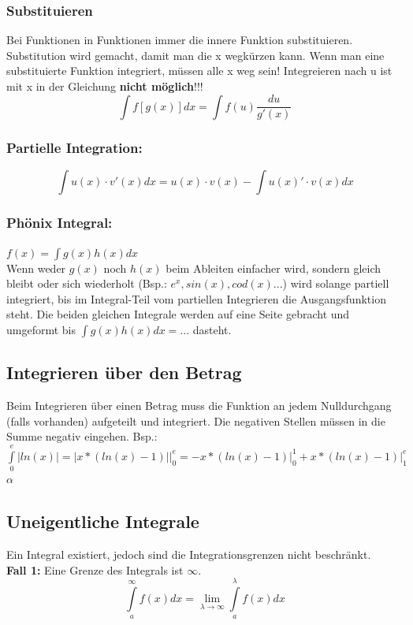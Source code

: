 \subsubsection{Substituieren}
Bei Funktionen in Funktionen immer die innere Funktion substituieren.
Substitution wird gemacht, damit man die x wegkürzen kann. 
Wenn man eine substituierte Funktion integriert, müssen alle x weg sein! Integreieren nach u ist mit x in der Gleichung \textbf{nicht möglich}!!!\\
\[\int f\left[g(x)\right] dx = \int f(u) \frac{du}{g'(x)}\]

\subsubsection{Partielle Integration:}
\[\int u(x)\cdot v'(x)dx = u(x)\cdot v(x)-\int u(x)'\cdot v(x)dx\]

\subsubsection{Phönix Integral:}
$f(x)= \int g(x)h(x)dx$\\

Wenn weder $g(x)$ noch $h(x)$ beim Ableiten einfacher wird, sondern gleich bleibt oder sich wiederholt (Bsp.: $e^x, sin(x), cod(x)...$) wird solange partiell integriert, bis im Integral-Teil vom partiellen Integrieren die Ausgangsfunktion steht. Die beiden gleichen Integrale werden auf eine Seite gebracht und umgeformt bis $\int g(x)h(x)dx = ... $ dasteht.


\subsection{Integrieren über den Betrag}
Beim Integrieren über einen Betrag muss die Funktion an jedem Nulldurchgang (falls vorhanden) aufgeteilt und integriert. Die negativen Stellen müssen in die Summe negativ eingehen.
Bsp.: $\int\limits_{0}^{e}|ln(x)| = |x*(ln(x)-1)|\big|_{0}^{e} = -x*(ln(x)-1)\big|_{0}^{1} + x*(ln(x)-1)\big|_{1}^{e}$ 
$\alpha$

\subsection{Uneigentliche Integrale}
Ein Integral existiert, jedoch sind die Integrationsgrenzen nicht beschränkt.\\
\textbf{Fall 1:} Eine Grenze des Integrals ist $\infty$.
\[\int\limits_a^{\infty}f(x)dx = \lim \limits_{\lambda \to \infty}\int\limits_a^{\lambda}f(x)dx\]


